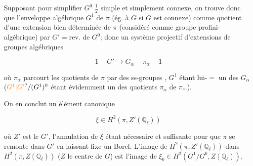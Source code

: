 

Supposant pour simplifier $G^0$  $\frac12$ simple et simplement connexe, on trouve donc que l'enveloppe algébrique $G^1$ de $\pi$ (ég. à $G$ si $G$ est connexe)  comme quotient d'une extension bien déterminée de $\pi$ (considéré comme groupe profini-algébrique) par $G'=\mathrm{rev.}$  de $G^0$; donc  un système projectif d'extensions de groupes algébriques


\[
1- G'\longrightarrow G_\alpha-\pi_\alpha-1
\]

où $\pi_\alpha$ parcourt les quotients de $\pi$ par des ss-groupes , $G^1$ étant lui-$=$ un des $G_\alpha$ \deleted{\unsure{$\Gamma$}} ($\unsure{G^1|G'}/(G^1)^0$ étant évidemment un des quotients $\pi_\alpha$ de $\pi$\ldots).


On en conclut un élément canonique

\[
\xi\in H^2(\pi,Z'(\mathbb Q_\ell))
\]

où $Z'$ est le  $G'$, l'annulation de $\xi$ étant nécessaire et suffisante pour que $\pi$ se remonte dans $G'$ en laissant fixe  un Borel. L'image de $H^2(\pi,Z'(\mathbb Q_\ell))$ dans $H^2(\pi,Z(\mathbb Q_\ell))$ ($Z$ le centre de $G$)  est l'image de $\xi_0\in H^2(G^1/G^0,Z(\mathbb Q_\ell))$, \unsure{$\}$}

